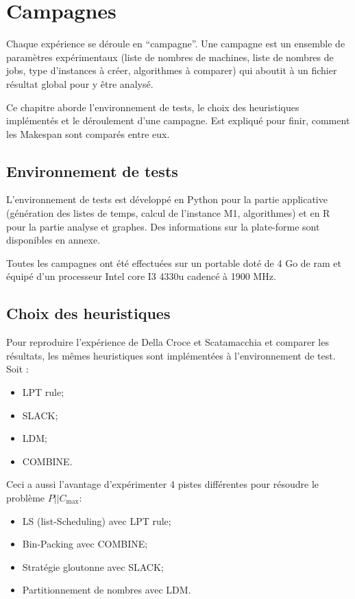 \documentclass[a4paper,12pt]{report}
\theoremstyle{plain}				%
\theoremstyle{definition}				%
\newcommand\problemGrahamP{$P||C_{\max}$\xspace}
\newcommand\dcs{Della Croce et Scatamacchia\xspace}
\begin{document}
\section{Campagnes} \label{sec:Campagnes}

Chaque expérience se déroule en ``campagne''. Une campagne est un ensemble de paramètres expérimentaux 
(liste de nombres de machines, liste de nombres de jobs, type d'instances à créer, algorithmes à comparer) 
qui aboutit à un fichier résultat global pour y être analysé.   

Ce chapitre aborde l’environnement de tests, le choix des heuristiques implémentés et le déroulement d'une campagne. Est expliqué pour finir, comment les Makespan sont comparés entre eux.

\subsection{Environnement de tests} \label{ssec:campagnesEnvironnementDeTests}

L'environnement de tests est développé 
  en Python pour la partie applicative 
  (génération des listes de temps, calcul de l'instance M1, algorithmes) et 
  en R pour la partie analyse et graphes. 
Des informations sur la plate-forme sont disponibles en annexe.

Toutes les campagnes ont été effectuées sur un portable 
  doté de 4 Go de ram et 
  équipé d'un processeur Intel core I3 4330u cadencé à 1900 MHz.


\subsection{Choix des heuristiques} \label{campagneChoisHeuristiques}

Pour reproduire l'expérience de \dcs et comparer les résultats, les mêmes heuristiques sont implémentées à l'environnement de test. Soit :
\begin{itemize}
	\item LPT rule;
	\item SLACK;
	\item LDM;
	\item COMBINE.
\end{itemize}

Ceci a aussi l'avantage d'expérimenter 4 pistes différentes pour résoudre le problème \problemGrahamP :
\begin{itemize}
	\item LS (list-Scheduling) avec LPT rule; 
	\item Bin-Packing avec COMBINE; 
	\item Stratégie gloutonne avec SLACK; 
	\item Partitionnement de nombres avec LDM.  
\end{itemize}
\end{document}
